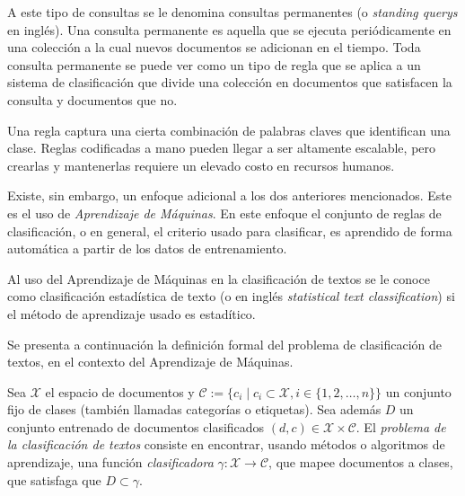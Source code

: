 \documentclass{llncs}
\begin{document}
	A este tipo de consultas se le denomina consultas permanentes  (o \emph{standing querys} en ingl\'es). Una consulta permanente es aquella que se ejecuta peri\'odicamente en una colecci\'on a la cual nuevos  documentos se adicionan en el tiempo. Toda consulta permanente se puede ver como un tipo de regla que se aplica a un sistema de clasificaci\'on que divide una colecci\'on en documentos que satisfacen la consulta y documentos que no.
	
	
	
	Una regla captura una cierta combinaci\'on de palabras claves que identifican una clase. Reglas codificadas a mano pueden llegar a ser altamente escalable, pero crearlas y mantenerlas requiere un elevado costo en recursos humanos.
	
	Existe, sin embargo, un enfoque adicional a los dos anteriores mencionados. Este es el uso de \emph{Aprendizaje de M\'aquinas}. En este enfoque el conjunto de reglas de clasificaci\'on, o en general, el criterio usado para clasificar, es aprendido de forma autom\'atica a partir de los datos de entrenamiento.
	
	Al uso del Aprendizaje de M\'aquinas en la clasificaci\'on de textos se le conoce como clasificaci\'on estad\'istica de texto (o en ingl\'es \emph{statistical text classification}) si el m\'etodo de aprendizaje usado es estad\'itico.
	
	Se presenta a continuaci\'on la definici\'on formal del problema de clasificaci\'on de textos, en el contexto del Aprendizaje de M\'aquinas.
	
	\begin{definition} \label{Problema_de_clasificacion}
		Sea $\mathcal{{X}}$ el espacio de documentos y $\mathcal{C} := \{c_i \mid c_i \subset \mathcal{X}, i \in \{ 1,2,\dots,n\} \}$ un conjunto fijo de clases (tambi\'en llamadas categor\'ias o etiquetas). Sea adem\'as $D$ un conjunto entrenado de documentos clasificados $(d,c) \in \mathcal X \times \mathcal{C}$. El \emph{problema de la clasificaci\'on de textos} consiste en encontrar, usando m\'etodos o algoritmos de aprendizaje, una funci\'on \emph{clasificadora} $\gamma : \mathcal{X} \rightarrow \mathcal{C}$, que mapee documentos a clases, que satisfaga que $D \subset \gamma$. 	

	\end{definition}
	
\end{document}
